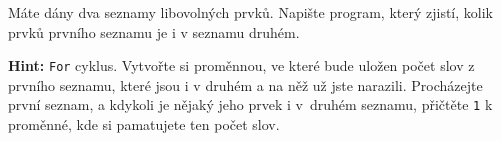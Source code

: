 \question[70]
Máte dány dva seznamy libovolných prvků. Napište program, který zjistí, kolik
prvků prvního seznamu je i v seznamu druhém.

\textbf{Hint:} \texttt{For} cyklus. Vytvořte si proměnnou, ve které bude uložen
počet slov z prvního seznamu, které jsou i v druhém a na něž už jste narazili.
Procházejte první seznam, a kdykoli je nějaký jeho prvek i v~druhém seznamu,
přičtěte \texttt{1} k proměnné, kde si pamatujete ten počet slov.